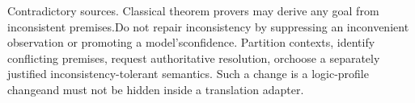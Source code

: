 \noindent
Contradictory sources. Classical theorem provers may derive any goal from inconsistent premises.\linebreak[4]
Do not repair inconsistency by suppressing an inconvenient observation or promoting a model's\linebreak[4]
confidence. Partition contexts, identify conflicting premises, request authoritative resolution, or\linebreak[4]
choose a separately justified inconsistency-tolerant semantics. Such a change is a logic-profile change\linebreak[4]
and must not be hidden inside a translation adapter.\par

